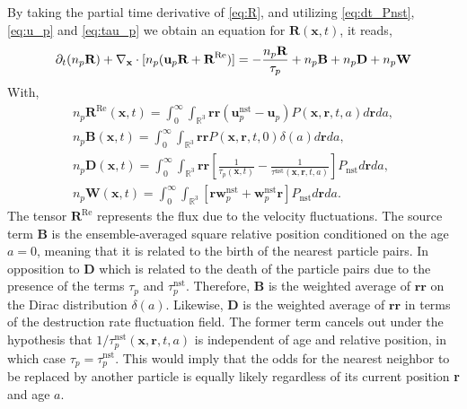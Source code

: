 By taking the partial time derivative of \ref{eq:R}, and utilizing \ref{eq:dt_Pnst}, \ref{eq:u_p} and \ref{eq:tau_p} we obtain an equation for $\textbf{R}(\textbf{x},t)$, it reads,
\begin{equation}
    \pddt (n_p\textbf{R})
    + \pddx \cdot [n_p(\textbf{u}_p\textbf{R}
    + \textbf{R}^\text{Re})]
    = 
    - \frac{n_p\textbf{R}}{\tau_p}
    +n_p\textbf{B}
    + n_p\textbf{D}
    + n_p\textbf{W}
    \label{eq:dt_R}
\end{equation}
With,
\begin{align*}
    n_p \textbf{R}^\text{Re}(\textbf{x},t)
    =
    \int_{0}^\infty
    \int_{\mathbb{R}^3}
    \textbf{rr}(\textbf{u}^\text{nst}_p - \textbf{u}_p)
    P(\textbf{x},\textbf{r},t,a)
    d\textbf{r}da,\\
    n_p \textbf{B}(\textbf{x},t)
    =
    \int_{0}^\infty
    \int_{\mathbb{R}^3}
    \textbf{rr}
    P(\textbf{x},\textbf{r},t,0)\delta(a)
    d\textbf{r}da, \\
    n_p\textbf{D}(\textbf{x},t) = 
    \int_{0}^\infty
    \int_{\mathbb{R}^3} \textbf{rr}
    \left[
        \frac{1}{\tau_p(\textbf{x},t)}
        - \frac{1}{\tau^\text{nst}(\textbf{x},\textbf{r},t,a)}
    \right]
    P_\text{nst}
    d\textbf{r}
    da,\\
    n_p \textbf{W}(\textbf{x},t) = 
    \int_{0}^\infty
    \int_{\mathbb{R}^3} \left[
        \textbf{r} \textbf{w}^\text{nst}_p
        + \textbf{w}^\text{nst}_p\textbf{r}
    \right]P_\text{nst}
    d\textbf{r}
    da.
\end{align*} 
The tensor $\textbf{R}^\text{Re}$ represents the flux due to the velocity fluctuations. 
The source term $\textbf{B}$ is the ensemble-averaged square relative position conditioned on the age $a=0$, meaning that it is related to the birth of the nearest particle pairs. 
In opposition to \textbf{D} which is related to the death of the particle pairs due to the presence of the terms $\tau_p$ and $\tau_p^\text{nst}$.
Therefore, $\textbf{B}$ is the weighted average of $\textbf{rr}$ on the Dirac distribution $\delta(a)$. 
Likewise, $\textbf{D}$ is the weighted average of $\textbf{rr}$ in terms of the destruction rate fluctuation field. 
The former term cancels out under the hypothesis that $1 / \tau^\text{nst}_p(\textbf{x},\textbf{r},t,a)$ is independent of age and relative position, in which case $\tau_p = \tau^\text{nst}_p$. 
This would imply that the odds for the nearest neighbor to be replaced by another particle is equally likely regardless of its current position \textbf{r} and age $a$. 
